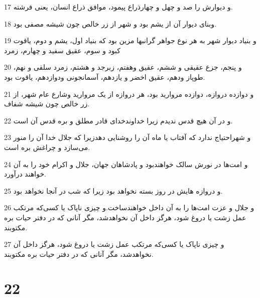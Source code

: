 \par 17 و دیوارش را صد و چهل و چهارذراع پیمود، موافق ذراع انسان، یعنی فرشته.
\par 18 وبنای دیوار آن از یشم بود و شهر از زر خالص چون شیشه مصفی بود.
\par 19 و بنیاد دیوار شهر به هر نوع جواهر گرانبها مزین بود که بنیاد اول، یشم و دوم، یاقوت کبود و سوم، عقیق سفید و چهارم، زمرد
\par 20 و پنجم، جزع عقیقی و ششم، عقیق وهفتم، زبرجد و هشتم، زمرد سلقی و نهم، طوپاز ودهم، عقیق اخضر و یازدهم، آسمانجونی ودوازدهم، یاقوت بود.
\par 21 و دوازده دروازه، دوازده مروارید بود، هر دروازه از یک مروارید وشارع عام شهر، از زر خالص چون شیشه شفاف.
\par 22 و در آن هیچ قدس ندیدم زیرا خداوندخدای قادر مطلق و بره قدس آن است.
\par 23 و شهراحتیاج ندارد که آفتاب یا ماه آن را روشنایی دهدزیرا که جلال خدا آن را منور می‌سازد و چراغش بره است.
\par 24 و امت‌ها در نورش سالک خواهندبود و پادشاهان جهان، جلال و اکرام خود را به آن خواهند درآورد.
\par 25 و دروازه هایش در روز بسته نخواهد بود زیرا که شب در آنجا نخواهد بود.
\par 26 و جلال و عزت امت‌ها را به آن داخل خواهندساخت.و چیزی ناپاک یا کسی‌که مرتکب عمل زشت یا دروغ شود، هرگز داخل آن نخواهدشد، مگر آنانی که در دفتر حیات بره مکتوبند.
\par 27 و چیزی ناپاک یا کسی‌که مرتکب عمل زشت یا دروغ شود، هرگز داخل آن نخواهدشد، مگر آنانی که در دفتر حیات بره مکتوبند.

\chapter{22}


